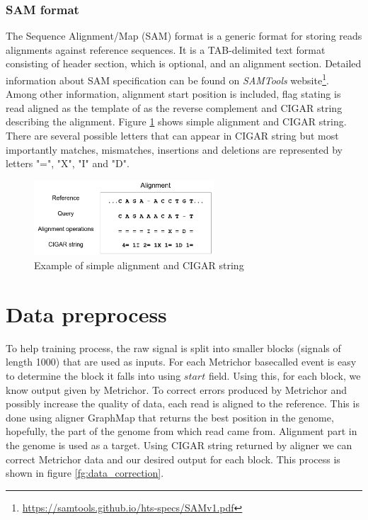 \documentclass[times, utf8, diplomski, numeric, english]{fer}
\begin{document}
\subsubsection{SAM format}
The Sequence Alignment/Map (SAM) format is a generic format for storing reads alignments against reference sequences. It is a TAB-delimited text format consisting
of header section, which is optional, and an alignment section. Detailed information about SAM specification can be found on \textit{SAMTools} website\footnote{\url{https://samtools.github.io/hts-specs/SAMv1.pdf}}.
Among other information, alignment start position is included, flag stating is read aligned as the template of as the reverse complement and CIGAR string describing the alignment.
Figure \ref{fg:align} shows simple alignment and CIGAR string. 
There are several possible letters that can appear in CIGAR string but most importantly matches, mismatches, insertions and deletions are represented by letters "=", "X", "I" and "D".


\begin{figure}[!ht]
	\begin{center}
		\includegraphics[width=0.6\textwidth]{./imgs/alignment.png}
		\caption{Example of simple alignment and CIGAR string}
		\label{fg:align}
	\end{center}
\end{figure} 


\section{Data preprocess}

To help training process, the raw signal is split into smaller blocks (signals of length 1000) that are used as inputs. For each Metrichor basecalled event is easy to determine the block it falls into using $start$ field. Using this, for each block, we know output given by Metrichor. 
To correct errors produced by Metrichor and possibly increase the quality of data, each read is aligned to the reference. This is done using aligner GraphMap\cite{sovic} that returns the best position in the genome, hopefully, the part of the genome from which read came from.
Alignment part in the genome is used as a target. Using CIGAR string returned by aligner we can correct Metrichor data and our desired output for each block. This process is shown in figure \ref{fg:data_correction}.
\end{document}
